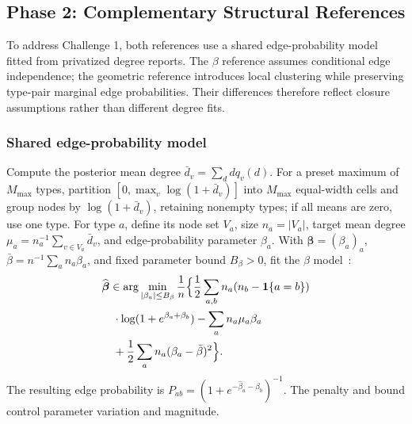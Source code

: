 \subsection{Phase 2: Complementary Structural References}
\label{sec:references}
\label{sec:gdd_reconstruction}
To address Challenge 1, both references use a shared edge-probability model fitted from privatized degree reports. The $\beta$ reference assumes conditional edge independence; the geometric reference introduces local clustering while preserving type-pair marginal edge probabilities. Their differences therefore reflect closure assumptions rather than different degree fits.

\subsubsection{Shared edge-probability model}
Compute the posterior mean degree $\bar d_v=\sum_d d q_v(d)$. For a preset maximum of $M_{\max}$ types, partition $[0,\max_v\log(1+\bar d_v)]$ into $M_{\max}$ equal-width cells and group nodes by $\log(1+\bar d_v)$, retaining nonempty types; if all means are zero, use one type. For type $a$, define its node set $V_a$, size $n_a=|V_a|$, target mean degree $\mu_a=n_a^{-1}\sum_{v\in V_a}\bar d_v$, and edge-probability parameter $\beta_a$. With $\boldsymbol\beta=(\beta_a)_a$, $\bar\beta=n^{-1}\sum_a n_a\beta_a$, and fixed parameter bound $B_\beta>0$, fit the $\beta$ model~\cite{chatterjee2011random}:
\begin{equation}
\begin{aligned}
&\widehat{\boldsymbol\beta}\in\arg\min_{|\beta_a|\le B_\beta}\frac1n
\Bigl\{\frac12\sum_{a,b}n_a(n_b-\mathbf1\{a=b\})\\
&\quad \cdot\log(1+e^{\beta_a+\beta_b})-\sum_a n_a\mu_a\beta_a\\
&\quad +\frac12\sum_a n_a(\beta_a-\bar\beta)^2\Bigr\}.
\end{aligned}
\label{eq:structural_beta_fit}
\end{equation}
The resulting edge probability is $P_{ab}=(1+e^{-\widehat\beta_a-\widehat\beta_b})^{-1}$. The penalty and bound control parameter variation and magnitude.

